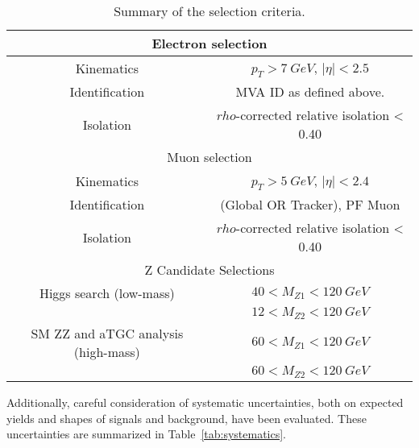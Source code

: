 \begin{table}[h]
\centering
\begin{tabular}{|c|c|}
\hline
\multicolumn{2}{|c|}{Electron selection} \\
\hline
Kinematics & $p_T > 7~GeV$, $|\eta| < 2.5$ \\
Identification & MVA ID as defined above. \\ 
Isolation & $rho$-corrected relative isolation < 0.40 \\
\hline
\multicolumn{2}{|c|}{Muon selection} \\
\hline
Kinematics & $p_T > 5~GeV$, $|\eta| < 2.4$ \\
Identification & (Global OR Tracker), PF Muon \\
Isolation & $rho$-corrected relative isolation < 0.40 \\
\hline
\multicolumn{2}{|c|}{Z Candidate Selections} \\
\hline
Higgs search (low-mass) & $40 < M_{Z1} < 120~GeV$ \\
                        & $12 < M_{Z2} < 120~GeV$ \\
SM ZZ and aTGC analysis (high-mass) & $60 < M_{Z1} < 120~GeV$ \\
                        & $60 < M_{Z2} < 120~GeV$ \\
\hline
\end{tabular}
\caption[Summary of the selection criteria.]{Summary of the selection criteria.}
\label{tab:selection_criteria}
\end{table}

Additionally, careful consideration of systematic uncertainties, both on
expected yields and shapes of signals and background, have been evaluated. These
uncertainties are summarized in Table~\ref{tab:systematics}.

